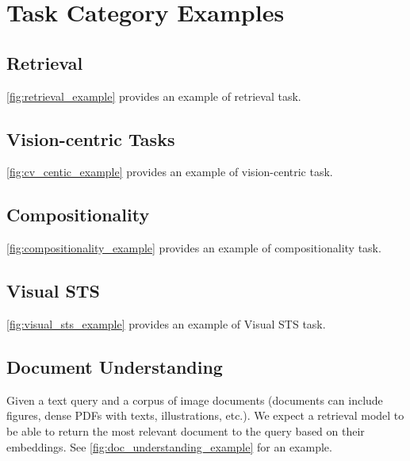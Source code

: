 













\clearpage
\section{Task Category Examples}

\subsection{Retrieval}
\autoref{fig:retrieval_example} provides an example of retrieval task.


\subsection{Vision-centric Tasks}
\autoref{fig:cv_centic_example} provides an example of vision-centric task.


\subsection{Compositionality}
\autoref{fig:compositionality_example} provides an example of compositionality task.


\subsection{Visual STS}
\autoref{fig:visual_sts_example} provides an example of Visual STS task.


\subsection{Document Understanding}
Given a text query and a corpus of image documents (documents can include figures, dense PDFs with texts, illustrations, etc.). We expect a retrieval model to be able to return the most relevant document to the query based on their embeddings. See \autoref{fig:doc_understanding_example} for an example. 



